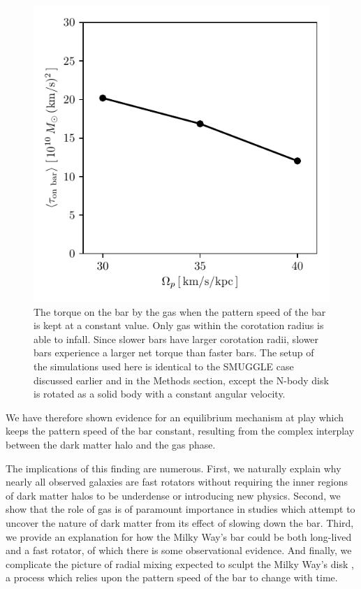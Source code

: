 \documentclass{natureprintstyle}
\begin{document}
\begin{figure}[h]
\centering
\includegraphics{fig/fig4.pdf}
\caption{The torque on the bar by the gas when the pattern speed of the bar is
kept at a constant value. Only gas within the corotation radius is able to
infall. Since slower bars have larger corotation radii, slower bars experience
a larger net torque than faster bars. The setup of the simulations used here
is identical to the SMUGGLE case discussed earlier and in the Methods section,
except the N-body disk is rotated as a solid body with a constant angular
velocity.}\label{fig:equil}
\end{figure}

We have therefore shown evidence for an equilibrium mechanism at play which
keeps the pattern speed of the bar constant, resulting from the complex
interplay between the dark matter halo and the gas phase.

The implications of this finding are numerous. First, we naturally explain why
nearly all observed galaxies are fast rotators without requiring the inner
regions of dark matter halos to be underdense\cite{1998ApJ...493L...5D,
2000ApJ...543..704D} or introducing new physics.\cite{2021MNRAS.503.2833R,
2021MNRAS.508..926R} Second, we show that the role of gas is of paramount
importance in studies which attempt to uncover the nature of dark matter from
its effect of slowing down the bar.\cite{2021MNRAS.500.4710C,
2021MNRAS.505.2412C} Third, we provide an explanation for how the Milky Way's
bar could be both long-lived and a fast rotator, of which there is some
observational evidence.\cite{2019MNRAS.490.4740B} And finally, we complicate
the picture of radial mixing expected to sculpt the Milky Way's disk
\cite{2012MNRAS.420..913B, 2015ApJ...808..132H}, a process which relies upon
the pattern speed of the bar to change with time.
\end{document}
